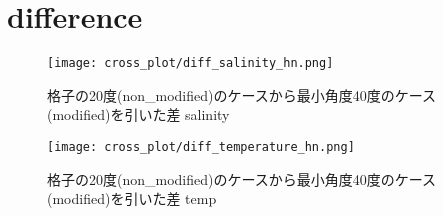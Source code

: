

\section{difference}
\begin{figure}[hbtp]
  \centering
  \texttt{[image: cross\_plot/diff\_salinity\_hn.png]}
  \caption{格子の20度(non\_modified)のケースから最小角度40度のケース(modified)を引いた差 salinity}
\end{figure}
\begin{figure}[hbtp]
  \centering
  \texttt{[image: cross\_plot/diff\_temperature\_hn.png]}
  \caption{格子の20度(non\_modified)のケースから最小角度40度のケース(modified)を引いた差 temp}
\end{figure}
